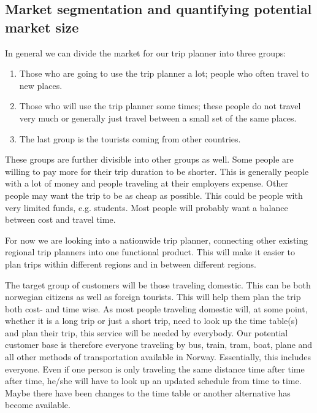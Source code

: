 \subsection{Market segmentation and quantifying potential market size}
In general we can divide the market for our trip planner into three groups:
\begin{enumerate}
	\item{Those who are going to use the trip planner a lot; people who often travel to new places.}
	\item{Those who will use the trip planner some times; these people do not travel very much or generally just travel between a small set of the same places.}
	\item{The last group is the tourists coming from other countries.}
\end{enumerate}
These groups are further divisible into other groups as well. Some people are willing to pay more for their trip duration to be shorter. This is generally people with a lot of money and people traveling at their employers expense. Other people may want the trip to be as cheap as possible. This could be people with very limited funds, e.g. students.
Most people will probably want a balance between cost and travel time.

For now we are looking into a nationwide trip planner, connecting other existing regional trip planners into one functional product. This will make it easier to plan trips within different regions and in between different regions.

The target group of customers will be those traveling domestic. This can be both norwegian citizens as well as foreign tourists. This will help them plan the trip both cost- and time wise.
As most people traveling domestic will, at some point, whether it is a long trip or just a short trip, need to look up the time table(s) and plan their trip, this service will be needed by everybody.
Our potential customer base is therefore everyone traveling by bus, train, tram, boat, plane and all other methods of transportation available in Norway. Essentially, this includes everyone.
Even if one person is only traveling the same distance time after time after time, he/she will have to look up an updated schedule from time to time.
Maybe there have been changes to the time table or another alternative has become available.